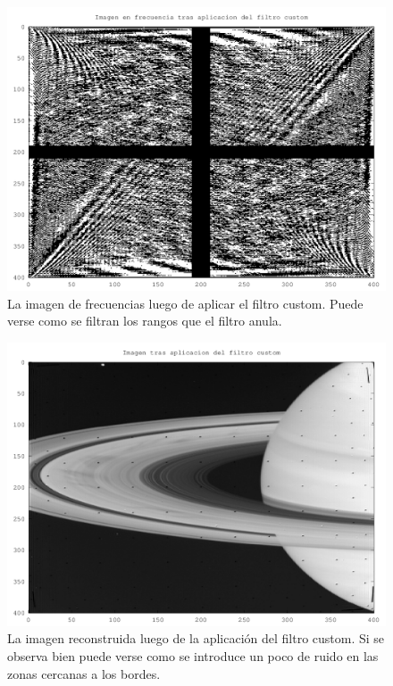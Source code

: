 \documentclass[twocolumn,a4paper,10pt]{article}
\begin{document}
\begin{figure}[H]
        \includegraphics[width=\linewidth]{../images/customFilterFreq.png}
        \caption{La imagen de frecuencias luego de aplicar el filtro custom. Puede verse como se filtran los rangos que el filtro anula.}
        \label{fig:customFilterFrequency}
\end{figure}

\begin{figure}[H]
        \includegraphics[width=\linewidth]{../images/customFilter.png}
        \caption{La imagen reconstruida luego de la aplicaci\'on del filtro custom. Si se observa bien puede verse como se introduce un poco de ruido 
        en las zonas cercanas a los bordes.}
        \label{fig:customFilter}
\end{figure}
\end{document}
